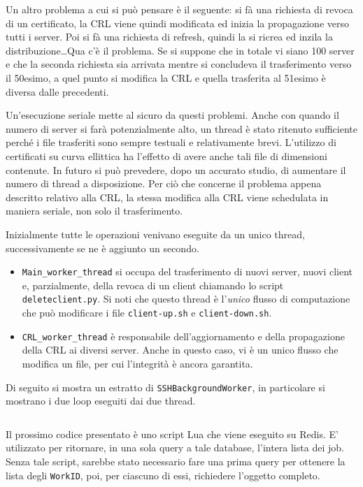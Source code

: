 Un altro problema a cui si può pensare è il seguente: si fà una richiesta di revoca di un certificato,
la CRL viene quindi modificata ed inizia la propagazione verso tutti i server.
Poi si fà una richiesta di refresh, quindi la si ricrea ed inzila la distribuzione\ldots Qua c'è il
problema. Se si suppone che in totale vi siano 100 server e che la seconda richiesta sia arrivata
mentre si concludeva il trasferimento verso il 50esimo, a quel punto si modifica la CRL
e quella trasferita al 51esimo è diversa dalle precedenti.

Un'esecuzione seriale mette al sicuro da questi problemi. Anche con quando il numero di server
si farà potenzialmente alto, un thread è stato ritenuto sufficiente perché i file trasferiti
sono sempre testuali e relativamente brevi. L'utilizzo di certificati su curva ellittica
ha l'effetto di avere anche tali file di dimensioni contenute. In futuro si può prevedere,
dopo un accurato studio, di aumentare il numero di thread a disposizione.
Per ciò che concerne il problema appena descritto relativo alla CRL, la stessa modifica alla CRL
viene schedulata in maniera seriale, non solo il trasferimento.


Inizialmente tutte le operazioni venivano eseguite da un unico thread, successivamente se ne
è aggiunto un secondo.
\begin{itemize}
	\item \texttt{Main\_worker\_thread} si occupa del trasferimento di nuovi server, nuovi
	client e, parzialmente, della revoca di un client chiamando lo script \texttt{deleteclient.py}.
	Si noti che questo thread è l'\textit{unico} flusso di computazione che può modificare
	i file \texttt{client-up.sh} e \texttt{client-down.sh}.
	\item \texttt{CRL\_worker\_thread} è responsabile dell'aggiornamento e della propagazione
	della CRL ai diversi server. Anche in questo caso, vi è un unico flusso che modifica
	un file, per cui l'integrità è ancora garantita.
\end{itemize}


Di seguito si mostra un estratto di \texttt{SSHBackgroundWorker}, in particolare si mostrano
i due loop eseguiti dai due thread.

\inputminted[tabsize=4, breaklines]{python}{code_samples/sshworker_loops.py}

Il prossimo codice presentato è uno script Lua che viene eseguito su Redis. E' utilizzato
per ritornare, in una sola query a tale database, l'intera lista dei job.
Senza tale script, sarebbe stato necessario fare una prima query per ottenere la lista degli
\texttt{WorkID}, poi, per ciascuno di essi, richiedere l'oggetto completo.

